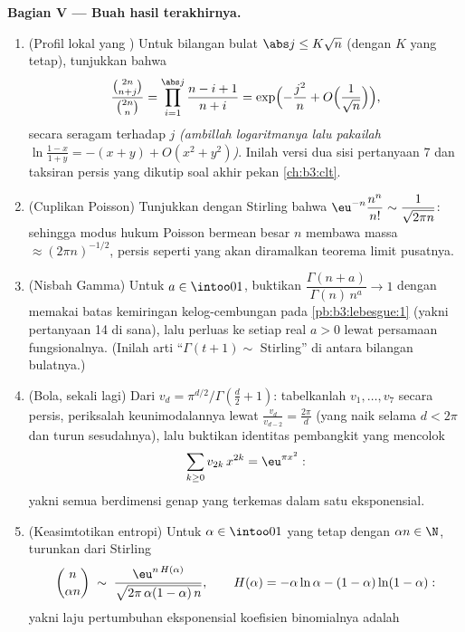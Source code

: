 \begin{problem}
\medskip
\noindent\textbf{Bagian V --- Buah hasil terakhirnya.}
\begin{enumerate}[resume]
  \item (Profil lokal yang ) Untuk bilangan bulat $\abs j \leq
        K\sqrt n$ (dengan $K$ yang tetap), tunjukkan bahwa
        \[
        \frac{\binom{2n}{n+j}}{\binom{2n}{n}} =
        \prod_{i=1}^{\abs j}\frac{n - i + 1}{n + i}
        = \exp\Bigl(-\frac{j^2}n +
        O\Bigl(\frac1{\sqrt n}\Bigr)\Bigr),
        \]
        secara seragam terhadap $j$ \emph{(ambillah logaritmanya lalu pakailah $\ln
        \frac{1-x}{1+y} = -(x + y) + O(x^2 + y^2)$)}. Inilah
        versi dua sisi pertanyaan 7 dan taksiran persis
        yang dikutip soal akhir pekan \cref{ch:b3:clt}.
  \item (Cuplikan Poisson) Tunjukkan dengan Stirling bahwa
        $\eu^{-n}\dfrac{n^n}{n!} \sim \dfrac1{\sqrt{2\pi n}}$:
        sehingga modus hukum Poisson bermean besar $n$ membawa
        massa $\approx (2\pi n)^{-1/2}$, persis seperti yang akan diramalkan
        teorema limit pusatnya.
  \item (Nisbah Gamma) Untuk $a \in \intoo01$, buktikan
        $\dfrac{\Gamma(n + a)}{\Gamma(n)\,n^a} \to 1$ dengan memakai
        batas kemiringan kelog-cembungan pada
        \cref{pb:b3:lebesgue:1} (yakni pertanyaan 14 di sana), lalu
        perluas ke setiap real $a > 0$ lewat persamaan
        fungsionalnya. (Inilah arti ``$\Gamma(t+1) \sim$
        Stirling'' di antara bilangan bulatnya.)
  \item (Bola, sekali lagi) Dari $v_d = \pi^{d/2}/\Gamma(\frac d2
        + 1)$: tabelkanlah $v_1, \dots, v_7$ secara persis, periksalah
        keunimodalannya lewat $\frac{v_d}{v_{d-2}} = \frac{2\pi}d$
        (yang naik selama $d < 2\pi$ dan turun sesudahnya), lalu
        buktikan identitas pembangkit yang mencolok
        \[
        \sum_{k\geq0}v_{2k}\,x^{2k} = \eu^{\pi x^2} :
        \]
        yakni semua  berdimensi genap yang terkemas dalam satu
        eksponensial.
  \item (Keasimtotikan entropi) Untuk $\alpha \in \intoo01$ yang tetap
        dengan $\alpha n \in \N$, turunkan dari Stirling
        \[
        \binom{n}{\alpha n} \;\sim\;
        \frac{\eu^{n\,H(\alpha)}}
        {\sqrt{2\pi\,\alpha(1-\alpha)\,n}},
        \qquad
        H(\alpha) = -\alpha\ln\alpha -
        (1-\alpha)\ln(1-\alpha) :
        \]
        yakni laju pertumbuhan eksponensial koefisien binomialnya adalah

\end{enumerate}
\end{problem}
